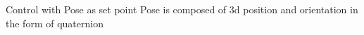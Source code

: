 \begin{frame}{Control with Pose as set point}
    Pose is composed of 3d position and orientation in the form of quaternion

\end{frame}